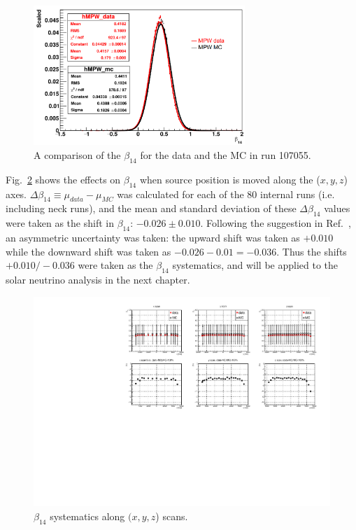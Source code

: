 \begin{figure}[htbp]
	\centering
	\includegraphics[width=8cm]{N16FitMPW_beta14_107055.png}
	\caption{A comparison of the $\beta_{14}$ for the data and the MC in run 107055. \label{fig:N16beta14MPW}}
\end{figure}

Fig.~\ref{beta14_XYZscans} shows the effects on $\beta_{14}$ when source position is moved along the ($x, y, z$) axes. $\Delta \beta_{14}\equiv\mu_{data}-\mu_{MC}$ was calculated for each of the 80 internal runs (i.e. including neck runs), and the mean and standard deviation of these $\Delta \beta_{14}$ values were taken as the shift in $\beta_{14}$: $-0.026\pm0.010$. Following the suggestion in Ref.~\cite{waterunidoc}, an asymmetric uncertainty was taken: the upward shift was taken as $+0.010$ while the downward shift was taken as $-0.026-0.01=-0.036$. Thus the shifts $+0.010/-0.036$ were taken as the $\beta_{14}$ systematics, and will be applied to the solar neutrino analysis in the next chapter. 

\begin{figure}[htbp]
	\centering
	\includegraphics[width=16cm]{beta14_xyzScans.pdf}
	\caption{$\beta_{14}$ systematics along $(x, y, z$) scans.	\label{beta14_XYZscans}}
\end{figure}

